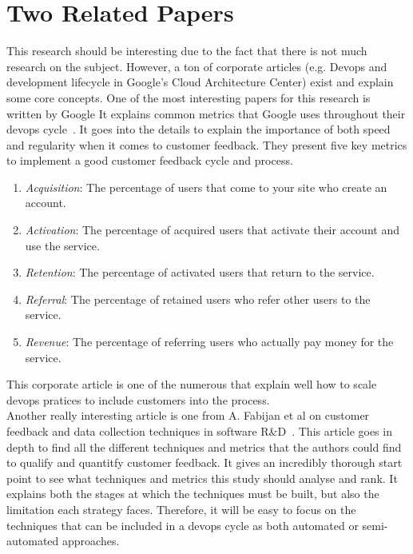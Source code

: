 \documentclass[10pt, conference]{IEEEtran}
\begin{document}
\section{Two Related Papers}
\label{sec:two-related-papers}

This research should be interesting due to the fact that there is not much research 
on the subject.
However, a ton of corporate articles (e.g. Devops and development lifecycle in 
Google's Cloud Architecture Center) exist and explain some core concepts. 
One of the most interesting papers for this research is written by Google
It explains common metrics that Google uses throughout their devops cycle~\cite{DORA}. 
It goes into the details to explain the importance of both speed and 
regularity when it comes to customer feedback. They present five key metrics to  
implement a good customer feedback cycle and process.
\begin{enumerate}
  \item \emph{Acquisition}: The percentage of users that come to your site who 
    create an account.
  \item \emph{Activation}: The percentage of acquired users that activate their 
    account and use the service.
  \item \emph{Retention}: The percentage of activated users that return to the service.
  \item \emph{Referral}: The percentage of retained users who refer other users to the service.
  \item \emph{Revenue}: The percentage of referring users who actually pay money for the service.
\end{enumerate}
This corporate article is one of the numerous that explain well how to scale 
devops pratices to include customers into the process.\\


Another really interesting article is one from A. Fabijan et al on customer 
feedback and data collection techniques in software R\&D~\cite{fabijan-olsson-15}. 
This article goes in depth to find all the different techniques and metrics 
that the authors could find to qualify and quantitfy customer feedback. 
It gives an incredibly thorough start point to see what techniques and metrics 
this study should analyse and rank.
It explains both the stages at which the techniques must be built, but also the 
limitation each strategy faces.
Therefore, it will be easy to focus on the techniques that can be included in 
a devops cycle as both automated or semi-automated approaches.
\end{document}
